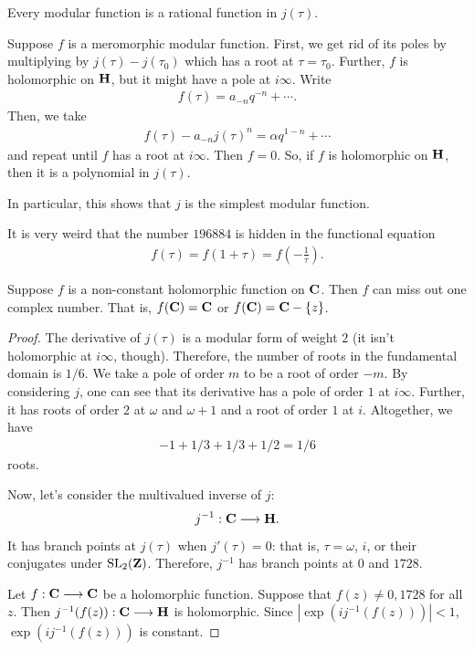 \documentclass[11pt, oneside,margin=1in]{article}
\begin{document}
\begin{proposition}[ ]\label{}\text{}
Every modular function is a rational function in $j(\tau)$.
\end{proposition}

Suppose $f$ is a meromorphic modular function. First, we get rid of its poles by multiplying by $j(\tau)- j (\tau_0)$ which has a root at $\tau=\tau_0$. Further, $f$ is holomorphic on $\mathbf H$, but it might have a pole at $i\infty$. Write 
\begin{align*}
	f(\tau) = a_{-n}q^{-n} +\cdots.
\end{align*}
Then, we take
\begin{align*}
	f(\tau) - a_{-n} j (\tau) ^n = \alpha q^{1-n} + \cdots
\end{align*}
and repeat until $f$ has a root at $i\infty$. Then $f=0$. So, if $f$ is holomorphic on $\mathbf H$, then it is a polynomial in $j(\tau)$. 

In particular, this shows that $j$ is the simplest modular function. 
\begin{remark}
	It is very weird that the number $196884$ is hidden in the functional equation
	\begin{align*}
		f(\tau) = f (1 + \tau) = f  \left( - \frac{1}{\tau} \right).
	\end{align*}
\end{remark}

\begin{theorem}[Picard]\label{}\index{}\text{}
Suppose $f$ is a non-constant holomorphic function on $\mathbf C$. Then $f$ can miss out one complex number. That is, $f(\mathbf C) = \mathbf C$ or $f(\mathbf C)= \mathbf C -  \{z\}$.
\end{theorem}

\begin{proof}
The derivative of $j(\tau)$ is a modular form of weight $2$ (it isn't holomorphic at $i\infty$, though). Therefore, the number of roots in the fundamental domain is $1/6$. We take a pole of order $m$ to be a root of order $-m$. By considering $j$, one can see that its derivative has a pole of order $1$ at $i\infty$. Further, it has roots of order $2$ at $\omega$ and $\omega + 1$ and a root of order $1$ at $i$. Altogether, we have
\begin{align*}
	-1 + 1/3 + 1/3 + 1/2 = 1/6
\end{align*}
roots.

Now, let's consider the multivalued inverse of $j$:
\begin{align*}
	j^{-1} : \mathbf C \longrightarrow \mathbf H.
\end{align*}
It has branch points at $j(\tau)$ when $j'(\tau) = 0$: that is, $\tau = \omega$, $i$, or their conjugates under $\operatorname{SL}_{2}(\mathbf Z)$. Therefore, $j^{-1}$ has branch points at $0$ and $1728$. 

Let $f:\mathbf C\longrightarrow \mathbf C$ be a holomorphic function. Suppose that $f(z) \ne 0,1728$ for all $z$. Then $j^{-1}(f(z)):\mathbf C\longrightarrow \mathbf H$ is holomorphic. Since $\left\lvert \exp(ij^{-1}(f(z))) \right\rvert <1$, $\exp(i j^{-1}(f(z)))$ is constant.
\end{proof}
\end{document}
